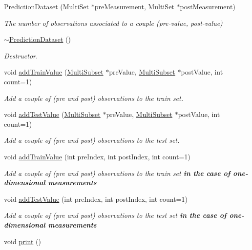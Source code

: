\begin{DoxyCompactItemize}
\item 
\hyperlink{classPredictionDataset_a5a2d75a4affa2b76dbb631f2f79c217e}{Prediction\-Dataset} (\hyperlink{classMultiSet}{Multi\-Set} $\ast$pre\-Measurement, \hyperlink{classMultiSet}{Multi\-Set} $\ast$post\-Measurement)
\begin{DoxyCompactList}\small\item\em The number of observations associated to a couple (pre-\/value, post-\/value) \end{DoxyCompactList}\item 
\hypertarget{classPredictionDataset_a9a30fa528fa4a2507a1a0a5fe8c74269}{\hyperlink{classPredictionDataset_a9a30fa528fa4a2507a1a0a5fe8c74269}{$\sim$\-Prediction\-Dataset} ()}\label{classPredictionDataset_a9a30fa528fa4a2507a1a0a5fe8c74269}

\begin{DoxyCompactList}\small\item\em Destructor. \end{DoxyCompactList}\item 
void \hyperlink{classPredictionDataset_ae2d6c192122c2f9f7a1b3232b486d86c}{add\-Train\-Value} (\hyperlink{classMultiSubset}{Multi\-Subset} $\ast$pre\-Value, \hyperlink{classMultiSubset}{Multi\-Subset} $\ast$post\-Value, int count=1)
\begin{DoxyCompactList}\small\item\em Add a couple of (pre and post) observations to the train set. \end{DoxyCompactList}\item 
void \hyperlink{classPredictionDataset_a097fc45e897544af6b5215a26fa41527}{add\-Test\-Value} (\hyperlink{classMultiSubset}{Multi\-Subset} $\ast$pre\-Value, \hyperlink{classMultiSubset}{Multi\-Subset} $\ast$post\-Value, int count=1)
\begin{DoxyCompactList}\small\item\em Add a couple of (pre and post) observations to the test set. \end{DoxyCompactList}\item 
void \hyperlink{classPredictionDataset_a9615dd7ab9f8dd04fb2fb28d68bd96b1}{add\-Train\-Value} (int pre\-Index, int post\-Index, int count=1)
\begin{DoxyCompactList}\small\item\em Add a couple of (pre and post) observations to the train set {\bfseries in the case of one-\/dimensional measurements} \end{DoxyCompactList}\item 
void \hyperlink{classPredictionDataset_a8298f94fac0d5b3761effdb20405417a}{add\-Test\-Value} (int pre\-Index, int post\-Index, int count=1)
\begin{DoxyCompactList}\small\item\em Add a couple of (pre and post) observations to the test set {\bfseries in the case of one-\/dimensional measurements} \end{DoxyCompactList}\item 
void \hyperlink{classPredictionDataset_a2d4d421a0299c9f965965f1d3797316e}{print} ()
\end{DoxyCompactItemize}
